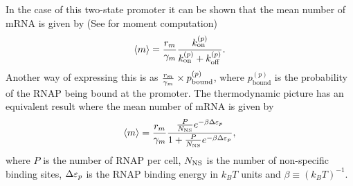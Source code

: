 In the case of this two-state promoter it can be shown that the mean number of
mRNA is given by \cite{Sanchez2013} (See  for moment
computation)
\begin{equation}
  \left\langle m \right\rangle = {r_m \over \gamma _m} {k^{(p)}_{\text{on}} \over k^{(p)}_{\text{on}} + k^{(p)}_{\text{off}}}.
  \label{seq_mean_kinetic}
\end{equation}
Another way of expressing this is as ${r_m \over \gamma _m} \times
p_{\text{bound}}^{(p)}$, where $p_{\text{bound}}^{(p)}$ is the probability of
the RNAP being bound at the promoter. The thermodynamic picture has an
equivalent result where the mean number of mRNA is given by \cite{Brewster2012,
Bintu2005a}
\begin{equation}
  \left\langle m \right\rangle = {r_m \over \gamma _m}
  {{P \over N_\text{NS}} e^{-\beta\Delta\varepsilon_p}
  \over 1 + {P \over N_\text{NS}} e^{-\beta\Delta\varepsilon_p}},
  \label{seq_mean_thermo}
\end{equation}
where $P$ is the number of RNAP
per cell, $N_\text{NS}$ is the number of non-specific binding sites,
$\Delta\varepsilon_p$ is the RNAP binding energy in $k_BT$ units and
$\beta\equiv {(k_BT)}^{-1}$.

